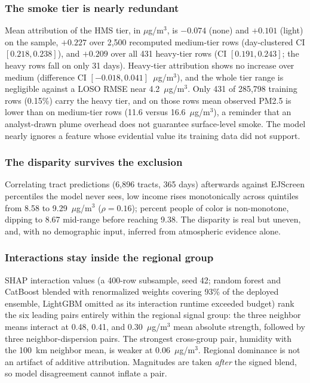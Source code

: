 \documentclass[conference]{IEEEtran}
\newcommand{\ugm}{$\mu$g/m$^3$}
\begin{document}
\subsubsection{The smoke tier is nearly redundant} Mean
attribution of the HMS tier, in \ugm{}, is $-0.074$ (none) and $+0.101$
(light) on the sample, $+0.227$ over 2,500 recomputed medium-tier rows
(day-clustered CI $[0.218, 0.238]$), and $+0.209$ over all 431 heavy-tier
rows (CI $[0.191, 0.243]$; the heavy rows fall on only 31 days). Heavy-tier
attribution shows no increase over medium (difference CI
$[-0.018, 0.041]$~\ugm{}), and the whole tier range is negligible against
a LOSO RMSE near 4.2~\ugm{}. Only 431 of
285,798 training rows (0.15\%) carry the heavy tier, and on those rows mean
observed PM2.5 is lower than on medium-tier rows (11.6 versus
16.6~\ugm{}), a reminder that an analyst-drawn plume overhead does not
guarantee surface-level smoke. The model nearly ignores a feature whose
evidential value its training data did not support.

\subsubsection{The disparity survives the exclusion} Correlating tract
predictions (6,896 tracts, 365 days) afterwards against EJScreen percentiles
the model never sees, low income rises monotonically across quintiles from
8.58 to 9.29~\ugm{} ($\rho=0.16$); percent people of color is non-monotone,
dipping to 8.67 mid-range before reaching 9.38. The disparity is real but
uneven, and, with no demographic input, inferred from atmospheric evidence
alone.

\subsubsection{Interactions stay inside the regional group} SHAP
interaction values (a 400-row subsample, seed 42; random forest and
CatBoost blended with renormalized weights covering 93\% of the deployed
ensemble, LightGBM omitted as its interaction runtime exceeded budget)
rank the six leading pairs entirely within the regional signal group: the
three neighbor means interact at 0.48, 0.41, and 0.30~\ugm{} mean absolute
strength, followed by three neighbor-dispersion pairs. The strongest
cross-group pair, humidity with the 100~km neighbor mean, is weaker at
0.06~\ugm{}. Regional dominance is not an artifact of additive
attribution. Magnitudes are taken \emph{after} the signed blend, so
model disagreement cannot inflate a pair.
\end{document}
